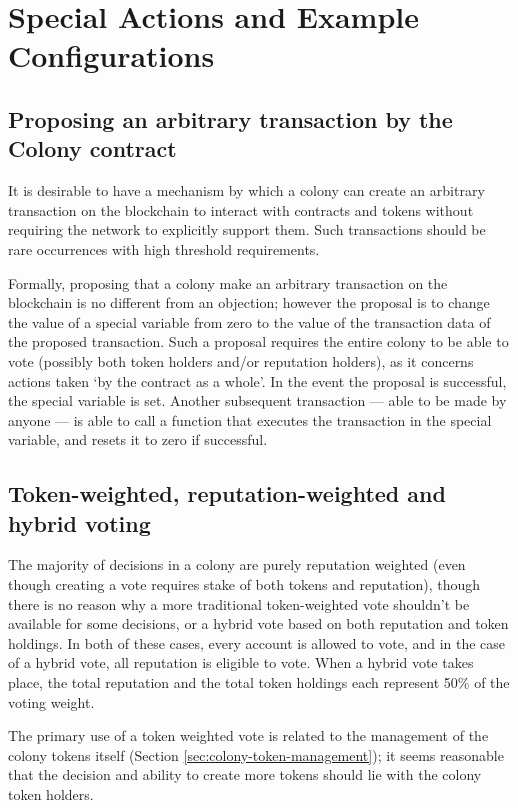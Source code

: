 

\section{Special Actions and Example Configurations}\label{sec:special-cases}

\subsection{Proposing an arbitrary transaction by the Colony contract}\label{sec:arbitrary-transaction}
It is desirable to have a mechanism by which a colony can create an arbitrary transaction on the blockchain to interact with contracts and tokens without requiring the network to explicitly support them. Such transactions should be rare occurrences with high threshold requirements.

Formally, proposing that a colony make an arbitrary transaction on the blockchain is no different from an objection; however the proposal is to change the value of a special variable from zero to the value of the transaction data of the proposed transaction. Such a proposal requires the entire colony to be able to vote (possibly both token holders and/or reputation holders), as it concerns actions taken `by the contract as a whole'. In the event the proposal is successful, the special variable is set. Another subsequent transaction --- able to be made by anyone --- is able to call a function that executes the transaction in the special variable, and resets it to zero if successful.

\subsection{Token-weighted, reputation-weighted and hybrid voting}
The majority of decisions in a colony are purely reputation weighted (even though creating a vote requires stake of both tokens and reputation), though there is no reason why a more traditional token-weighted vote shouldn't be available for some decisions, or a hybrid vote based on both reputation and token holdings. In both of these cases, every account is allowed to vote, and in the case of a hybrid vote, all reputation is eligible to vote. When a hybrid vote takes place, the total reputation and the total token holdings each represent 50\% of the voting weight.

The primary use of a token weighted vote is related to the management of the colony tokens itself (Section \ref{sec:colony-token-management}); it seems reasonable that the decision and ability to create more tokens should lie with the colony token holders.

